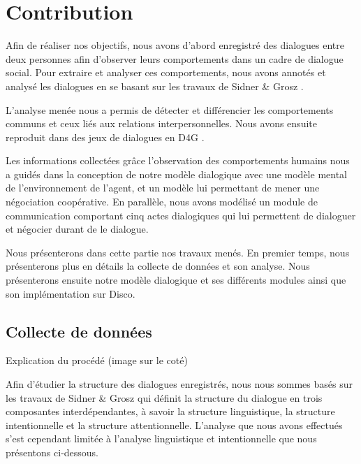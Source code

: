 \documentclass[a4paper,french]{article}
\begin{document}
\section{Contribution}
\label{contribution}

\par Afin de réaliser nos objectifs, nous avons d'abord enregistré des dialogues entre deux personnes afin d'observer leurs comportements dans un cadre de dialogue social. 
Pour extraire et analyser ces comportements, nous avons annotés et analysé les dialogues  en se basant sur les travaux de Sidner \& Grosz \cite{grosz1986attention}. \par L'analyse menée nous a permis de détecter et différencier les comportements communs et ceux liés aux relations interpersonnelles. Nous avons ensuite reproduit dans des jeux de dialogues en D4G \cite{rich}. 

\par Les informations collectées grâce l'observation des comportements humains nous a guidés dans la conception de notre modèle dialogique avec une modèle mental de l'environnement de l'agent, et un modèle lui permettant de mener une négociation coopérative. 
En parallèle, nous avons modélisé un module de communication comportant cinq actes dialogiques qui lui permettent de dialoguer et négocier durant de le dialogue. 
\par Nous présenterons dans cette partie nos travaux menés. En premier temps, nous présenterons plus en détails la collecte de données et son analyse. 
	Nous présenterons ensuite notre modèle dialogique et ses différents modules ainsi que son implémentation sur Disco. 
\subsection{Collecte de données}

Explication du procédé (image sur le coté)

Afin d'étudier la structure des dialogues enregistrés, nous nous sommes basés sur les travaux de Sidner \& Grosz \cite{grosz1986attention}  qui définit la structure du dialogue en trois composantes interdépendantes, à savoir la structure linguistique, la structure intentionnelle et la structure attentionnelle. L'analyse que nous avons effectués s'est cependant limitée à l'analyse linguistique et intentionnelle que nous présentons ci-dessous. 
\end{document}
